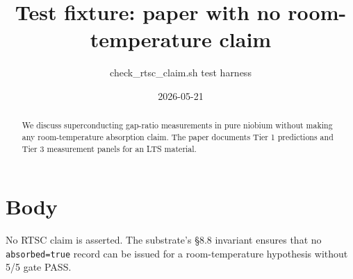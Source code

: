 \documentclass[11pt,a4paper]{article}
\title{Test fixture: paper with no room-temperature claim}
\author{check_rtsc_claim.sh test harness}
\date{2026-05-21}
\begin{document}
\maketitle

\begin{abstract}
We discuss superconducting gap-ratio measurements in pure niobium without
making any room-temperature absorption claim. The paper documents Tier 1
predictions and Tier 3 measurement panels for an LTS material.
\end{abstract}

\section{Body}
No RTSC claim is asserted. The substrate's §8.8 invariant ensures that
no \texttt{absorbed=true} record can be issued for a room-temperature
hypothesis without 5/5 gate PASS.
\end{document}
